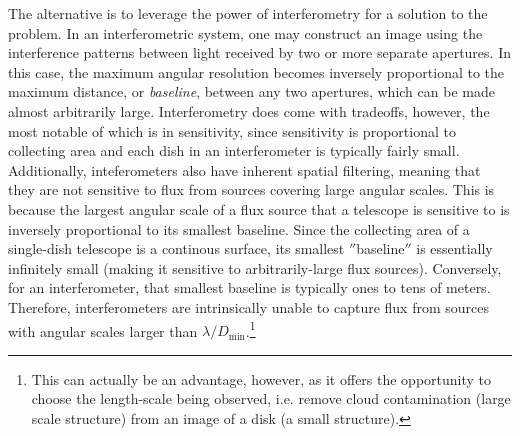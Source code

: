 The alternative is to leverage the power of interferometry for a solution to the problem. In an interferometric system, one may construct an image using the interference patterns between light received by two or more separate apertures. In this case, the maximum angular resolution becomes inversely proportional to the maximum distance, or \textit{baseline}, between any two  apertures, which can be made almost arbitrarily large. Interferometry does come with tradeoffs, however, the most notable of which is in sensitivity, since sensitivity is proportional to collecting area and each dish in an interferometer is typically fairly small. Additionally, inteferometers also have inherent spatial filtering, meaning that they are not sensitive to flux from sources covering large angular scales. This is because the largest angular scale of a flux source that a telescope is sensitive to is inversely proportional to its smallest baseline. Since the collecting area of a single-dish telescope is a continous surface, its smallest $''$baseline$''$ is essentially infinitely small (making it sensitive to arbitrarily-large flux sources). Conversely, for an interferometer, that smallest baseline is typically ones to tens of meters. Therefore, interferometers are intrinsically unable to capture flux from sources with angular scales larger than $\lambda/D_\text{min}$.\footnote{This can actually be an advantage, however, as it offers the opportunity to choose the length-scale being observed, i.e. remove cloud contamination (large scale structure) from an image of a disk (a small structure).}




